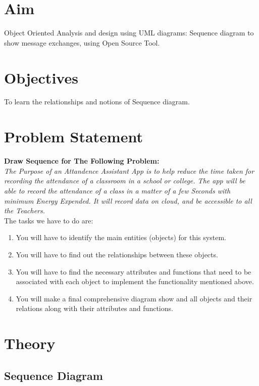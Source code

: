 \documentclass[11pt]{article}
\begin{document}
\tableofcontents
\thispagestyle{empty}
\clearpage

\setcounter{page}{1}

\section{Aim}
Object Oriented Analysis and design using UML diagrams: Sequence diagram to show
message exchanges, using Open Source Tool.

\section{Objectives}
To learn the relationships and notions of Sequence diagram.

\section{Problem Statement}

\textbf{Draw Sequence for The Following Problem:} \\

\textit{The Purpose of an Attandence Assistant App is to help reduce the time taken for recording the attendance of a classroom in a school or college. The app will be able to record the attendance of a class in a matter of a few Seconds with minimum Energy Expended. It will record data on cloud, and be accessible to all the Teachers.}\\

The tasks we have to do are:
\begin{enumerate}
	\item You will have to identify the main entities (objects) for this system.
	\item You will have to find out the relationships between these objects.
	\item You will have to find the necessary attributes and functions that need to be associated
	      with each object to implement the functionality mentioned above.
	\item You will make a final comprehensive diagram show and all objects and their relations
	      along with their attributes and functions.
\end{enumerate}

\section{Theory}


\subsection{Sequence Diagram}
\end{document}
